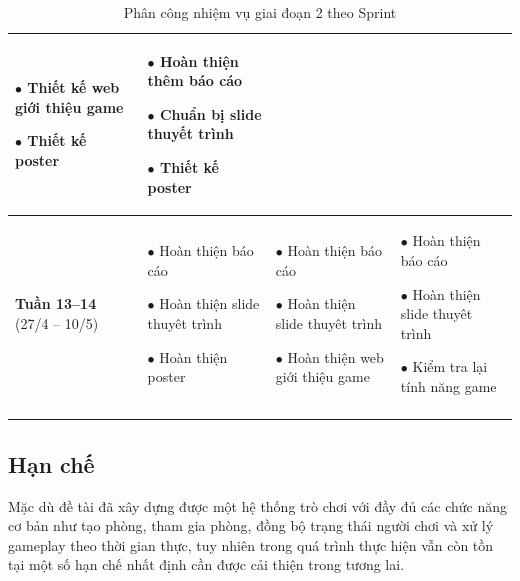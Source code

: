 \begin{longtable}{|p{2cm}|p{4cm}|p{4cm}|p{4cm}|}
    $\bullet$ Thiết kế web giới thiệu game

    $\bullet$ Thiết kế poster
&
    $\bullet$ Hoàn thiện thêm báo cáo
    
    $\bullet$ Chuẩn bị slide thuyết trình

    $\bullet$ Thiết kế poster
\\
\hline

\textbf{Tuần 13--14} \newline (27/4 -- 10/5)
&
    $\bullet$ Hoàn thiện báo cáo
    
    $\bullet$ Hoàn thiện slide thuyêt trình

    $\bullet$ Hoàn thiện poster
&
    $\bullet$ Hoàn thiện báo cáo
    
    $\bullet$ Hoàn thiện slide thuyêt trình

    $\bullet$ Hoàn thiện web giới thiệu game
&
    $\bullet$ Hoàn thiện báo cáo
    
    $\bullet$ Hoàn thiện slide thuyêt trình

    $\bullet$ Kiểm tra lại tính năng game
\\
\hline




\caption{Phân công nhiệm vụ giai đoạn 2 theo Sprint}
\end{longtable}


\subsection{Hạn chế}

Mặc dù đề tài đã xây dựng được một hệ thống trò chơi với đầy đủ các chức năng cơ bản như tạo phòng, tham gia phòng, đồng bộ trạng thái người chơi và xử lý gameplay theo thời gian thực, tuy nhiên trong quá trình thực hiện vẫn còn tồn tại một số hạn chế nhất định cần được cải thiện trong tương lai.

